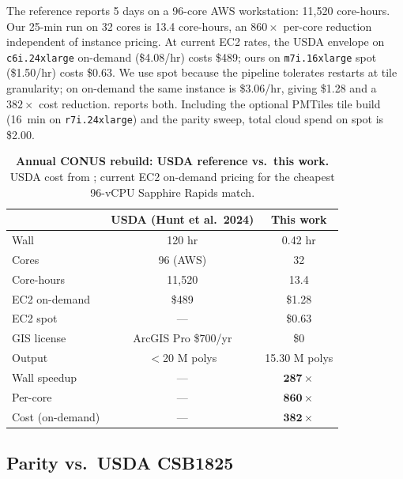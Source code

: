 \documentclass{article}
\begin{document}
The reference \citep{hunt2024csb} reports 5 days on a 96-core AWS
workstation: 11{,}520 core-hours. Our 25-min run on 32 cores is
13.4 core-hours, an $860\times$ per-core reduction independent of
instance pricing. At current EC2 rates, the USDA envelope on
\texttt{c6i.24xlarge} on-demand (\$4.08/hr) costs \$489; ours on
\texttt{m7i.16xlarge} spot (\$1.50/hr) costs \$0.63. We use spot
because the pipeline tolerates restarts at tile granularity; on
on-demand the same instance is \$3.06/hr, giving \$1.28 and a
$382\times$ cost reduction.  reports both. Including
the optional PMTiles tile build (16~min on \texttt{r7i.24xlarge}) and
the parity sweep, total cloud spend on spot is \$2.00.

\begin{table}[t]
\centering
\caption{\textbf{Annual CONUS rebuild: USDA reference vs.\ this work.}
USDA cost from \citet{hunt2024csb}; current EC2 on-demand pricing
\citep{aws_ec2_pricing} for the cheapest 96-vCPU Sapphire Rapids match.}
\label{tab:cost}
\small
\begin{tabular}{lcc}
\toprule
              & USDA (Hunt et al.\ 2024) & This work \\
\midrule
Wall          & 120 hr                   & 0.42 hr \\
Cores         & 96 (AWS)                 & 32 \\
Core-hours    & 11{,}520                 & 13.4 \\
EC2 on-demand & \$489                    & \$1.28 \\
EC2 spot      & ---                      & \$0.63 \\
GIS license   & ArcGIS Pro \$700/yr      & \$0 \\
Output        & $<$20 M polys            & 15.30 M polys \\
Wall speedup  & ---                      & $\mathbf{287\times}$ \\
Per-core      & ---                      & $\mathbf{860\times}$ \\
Cost (on-demand) & ---                   & $\mathbf{382\times}$ \\
\bottomrule
\end{tabular}
\end{table}

\subsection{Parity vs.\ USDA CSB1825}
\label{sec:results-parity}
\end{document}
